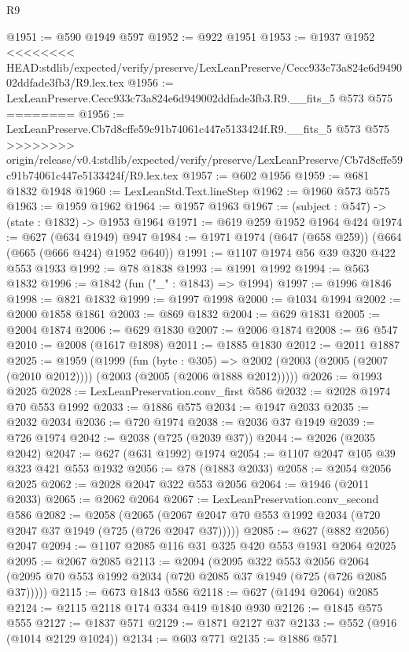 \begin{lexlean}{R9}
\begin{coremodule}
{{{{{{{{{{{{{{{{{{{{{@1951 := @590 @1949 @597
@1952 := @922 @1951
@1953 := @1937 @1952
<<<<<<<< HEAD:stdlib/expected/verify/preserve/LexLeanPreserve/Cecc933c73a824e6d949002ddfade3fb3/R9.lex.tex
@1956 := LexLeanPreserve.Cecc933c73a824e6d949002ddfade3fb3.R9.__fits_5 @573 @575
========
@1956 := LexLeanPreserve.Cb7d8cffe59c91b74061c447e5133424f.R9.__fits_5 @573 @575
>>>>>>>> origin/release/v0.4:stdlib/expected/verify/preserve/LexLeanPreserve/Cb7d8cffe59c91b74061c447e5133424f/R9.lex.tex
@1957 := @602 @1956
@1959 := @681 @1832 @1948
@1960 := LexLeanStd.Text.lineStep
@1962 := @1960 @573 @575
@1963 := @1959 @1962
@1964 := @1957 @1963
@1967 := (subject : @547) -> (state : @1832) -> @1953 @1964
@1971 := @619 @259 @1952 @1964 @424
@1974 := @627 (@634 @1949) @947
@1984 := @1971 @1974 (@647 (@658 @259)) (@664 (@665 (@666 @424) @1952 @640))
@1991 := @1107 @1974 @56 @39 @320 @422 @553 @1933
@1992 := @78 @1838
@1993 := @1991 @1992
@1994 := @563 @1832
@1996 := @1842 (fun ("_" : @1843) => @1994)
@1997 := @1996 @1846
@1998 := @821 @1832
@1999 := @1997 @1998
@2000 := @1034 @1994
@2002 := @2000 @1858 @1861
@2003 := @869 @1832
@2004 := @629 @1831
@2005 := @2004 @1874
@2006 := @629 @1830
@2007 := @2006 @1874
@2008 := @6 @547
@2010 := @2008 (@1617 @1898)
@2011 := @1885 @1830
@2012 := @2011 @1887
@2025 := @1959
    (@1999
      (fun (byte : @305) =>
      @2002 (@2003 (@2005 (@2007 (@2010 @2012)))) (@2003 (@2005 (@2006 @1888 @2012)))))
@2026 := @1993 @2025
@2028 := LexLeanPreservation.conv_first @586
@2032 := @2028 @1974 @70 @553 @1992
@2033 := @1886 @575
@2034 := @1947 @2033
@2035 := @2032 @2034
@2036 := @720 @1974
@2038 := @2036 @37 @1949
@2039 := @726 @1974
@2042 := @2038 (@725 (@2039 @37))
@2044 := @2026 (@2035 @2042)
@2047 := @627 (@631 @1992) @1974
@2054 := @1107 @2047 @105 @39 @323 @421 @553 @1932
@2056 := @78 (@1883 @2033)
@2058 := @2054 @2056 @2025
@2062 := @2028 @2047 @322 @553 @2056
@2064 := @1946 (@2011 @2033)
@2065 := @2062 @2064
@2067 := LexLeanPreservation.conv_second @586
@2082 := @2058
    (@2065 (@2067 @2047 @70 @553 @1992 @2034 (@720 @2047 @37 @1949 (@725 (@726 @2047 @37)))))
@2085 := @627 (@882 @2056) @2047
@2094 := @1107 @2085 @116 @31 @325 @420 @553 @1931 @2064 @2025
@2095 := @2067 @2085
@2113 := @2094
    (@2095
      @322
      @553
      @2056
      @2064
      (@2095 @70 @553 @1992 @2034 (@720 @2085 @37 @1949 (@725 (@726 @2085 @37)))))
@2115 := @673 @1843 @586
@2118 := @627 (@1494 @2064) @2085
@2124 := @2115 @2118 @174 @334 @419 @1840 @930
@2126 := @1845 @575 @555
@2127 := @1837 @571
@2129 := @1871 @2127 @37
@2133 := @552 (@916 (@1014 @2129 @1024))
@2134 := @603 @771
@2135 := @1886 @571
}}}}}}}}}}}}}}}}}}}}}
\end{coremodule}
\end{lexlean}
